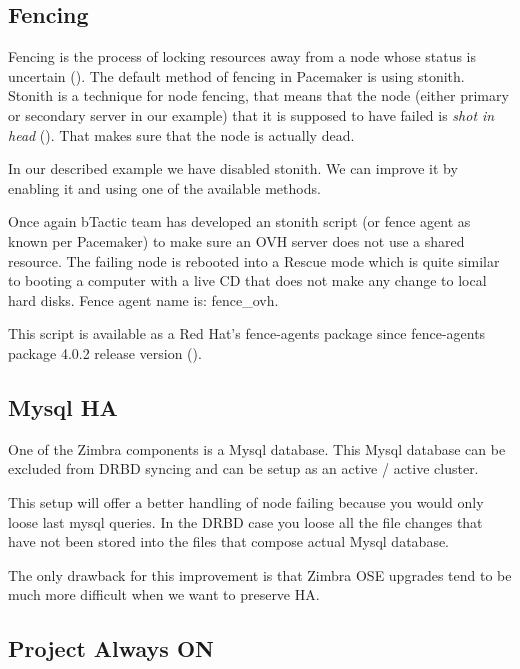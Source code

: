 \subsection {\label{subsec:fencing}Fencing}
Fencing is the process of locking resources away from a node whose status is uncertain (\cite{LinuxHAFencing}). The default method of fencing in Pacemaker is using stonith. Stonith is a technique for node fencing, that means that the node (either primary or secondary server in our example) that it is supposed to have failed is \textit{shot in head} (\cite{LinuxHAStonith}). That makes sure that the node is actually dead.

In our described example we have disabled stonith. We can improve it by enabling it and using one of the available methods.

Once again bTactic team has developed an stonith script (or fence agent as known per Pacemaker) to make sure an OVH server does not use a shared resource. The failing node is rebooted into a Rescue mode which is quite similar to booting a computer with a live CD that does not make any change to local hard disks. Fence agent name is: fence\_ovh.

This script is available as a Red Hat's fence-agents package since fence-agents package 4.0.2 release version (\cite{LinuxClusterML201307}).

\subsection {\label{subsection:mysql-ha}Mysql HA}
One of the Zimbra components is a Mysql database. This Mysql database can be excluded from DRBD syncing and can be setup as an active / active cluster.

This setup will offer a better handling of node failing because you would only loose last mysql queries. In the DRBD case you loose all the file changes that have not been stored into the files that compose actual Mysql database.

The only drawback for this improvement is that Zimbra OSE upgrades tend to be much more difficult when we want to preserve HA.

\subsection {Project Always ON}

